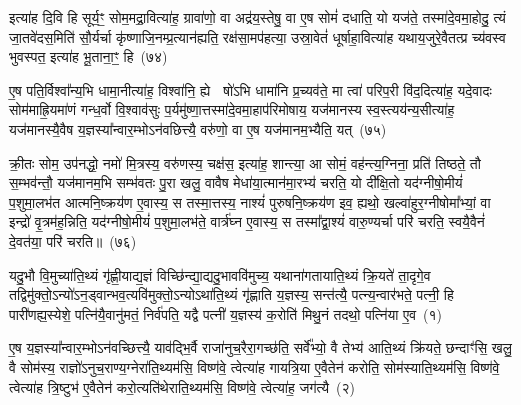 इत्या॑ह दि॒वि हि सूर्य॒ꣳ॒ सोम॒मद्रा॒वित्या॑ह॒ ग्रावा॑णो॒ वा अद्र॑य॒स्तेषु॒ वा ए॒ष सोमं॑ दधाति॒ यो यज॑ते॒ तस्मा॑दे॒वमा॒होदु॒ त्यं जा॒तवे॑दस॒मिति॑ सौ॒र्यर्चा कृ॑ष्णाजि॒नम्प्र॒त्यान॑ह्यति॒ रक्ष॑सा॒मप॑हत्या॒ उस्रा॒वेतं॑ धूर्\mbox{}षाहा॒वित्या॑ह यथाय॒जुरे॒वैतत्प्र च्य॑वस्व भुवस्पत॒ इत्या॑ह भू॒ताना॒ꣳ॒ हि~(७४)

ए॒ष पति॒र्विश्वा᳚न्य॒भि धामा॒नीत्या॑ह॒ विश्वा॑नि॒ ह्ये  षो॑\-ऽभि धामा॑नि प्र॒च्यव॑ते॒ मा त्वा॑ परिप॒री वि॑द॒दित्या॑ह॒ यदे॒वादः सोम॑माह्रि॒यमा॑णं गन्ध॒र्वो वि॒श्वाव॑सुः प॒र्यमु॑ष्णा॒त्तस्मा॑दे॒वमा॒हाप॑रिमोषाय॒ यज॑मानस्य स्व॒स्त्यय॑न्य॒सीत्या॑ह॒ यज॑मानस्यै॒वैष य॒ज्ञस्या᳚न्वार॒म्भो\-ऽन॑वछित्त्यै॒ वरु॑णो॒ वा ए॒ष यज॑मानम॒भ्यैति॒ यत्~(७५)

क्री॒तः सोम॒ उप॑नद्धो॒ नमो॑ मि॒त्रस्य॒ वरु॑णस्य॒ चक्ष॑स॒ इत्या॑ह॒ शान्त्या॒ आ सोमं॒ वह॑न्त्य॒ग्निना॒ प्रति॑ तिष्ठते॒ तौ स॒म्भव॑न्तौ॒ यज॑मानम॒भि सम्भ॑वतः पु॒रा खलु॒ वावैष मेधा॑या॒त्मान॑मा॒रभ्य॑ चरति॒ यो दी᳚क्षि॒तो यद॑ग्नीषो॒मीयं॑ प॒शुमा॒लभ॑त आत्मनि॒ष्क्रय॑ण ए॒वास्य॒ स तस्मा॒त्तस्य॒ नाश्यं॑ पुरुषनि॒ष्क्रय॑ण इव॒ ह्यथो॒ खल्वा॑हुर॒ग्नी\-षोमा᳚भ्यां॒ वा इन्द्रो॑ वृ॒त्रम॑ह॒न्निति॒ यद॑ग्नीषो॒मीयं॑ प॒शुमा॒लभ॑ते॒ वार्त्र॑घ्न ए॒वास्य॒ स तस्मा᳚द्वा॒श्यं॑ वारु॒ण्यर्चा परि॑ चरति॒ स्वयै॒वैनं॑ दे॒वत॑या॒ परि॑ चरति॥~(७६)

{\anuvakamend[{अ॒न्वा॒रभ्योथ्सर्वा॑भिरे॒व सूर्यं॑ भू॒ताना॒ꣳ॒ ह्ये॑ति॒ यदा॑हुः स॒प्तविꣳ॑शतिश्च}]}%


{\anuvakamend[{यदु॒भौ दे॑वासु॒रा मि॒थस्तेषाꣳ॑ सुव॒र्गं यद्वा अनी॑शानः पु॒रोह॑विषि॒ तेभ्यः॒ सोत्त॑रवे॒दिर्ब॒द्धं दे॒वस्याभ्रि॒ꣳ॒ शिरो॒ वा एका॑\-दश}]}%
{}

\setcounter{anuvakam}{0}
यदु॒भौ वि॒मुच्या॑ति॒थ्यं गृ॑ह्णी॒याद्य॒ज्ञं विच्छि॑न्द्या॒द्यदु॒भाववि॑मुच्य॒ यथाना॑गतायाति॒थ्यं क्रि॒यते॑ ता॒दृगे॒व तद्विमु॑क्तो॒\-ऽन्यो॑\-ऽन॒ड्वान्भव॒त्यवि॑मुक्तो॒\-ऽन्यो\-ऽथा॑ति॒थ्यं गृ॑ह्णाति य॒ज्ञस्य॒ सन्त॑त्यै॒ पत्न्य॒न्वार॑भते॒ पत्नी॒ हि पारी॑णह्य॒स्येशे॒ पत्नि॑यै॒वानु॑मतं॒ निर्व॑पति॒ यद्वै पत्नी॑ य॒ज्ञस्य॑ क॒रोति॑ मिथु॒नं तदथो॒ पत्नि॑या ए॒व~(१)

ए॒ष य॒ज्ञस्या᳚न्वार॒म्भो\-ऽन॑वच्छित्त्यै॒ याव॑द्भि॒र्वै राजा॑नुच॒रैरा॒गच्छ॑ति॒ सर्वे᳚भ्यो॒ वै तेभ्य॑ आति॒थ्यं क्रि॑यते॒ छन्दाꣳ॑सि॒ खलु॒ वै सोम॑स्य॒ राज्ञो॑\-ऽनुच॒राण्य॒ग्नेरा॑ति॒थ्यम॑सि॒ विष्ण॑वे॒ त्वेत्या॑ह गायत्रि॒या ए॒वैतेन॑ करोति॒ सोम॑स्याति॒थ्यम॑सि॒ विष्ण॑वे॒ त्वेत्या॑ह त्रि॒ष्टुभ॑ ए॒वैतेन॑ करो॒त्यति॑थेराति॒थ्यम॑सि॒ विष्ण॑वे॒ त्वेत्या॑ह॒ जग॑त्यै~(२)

